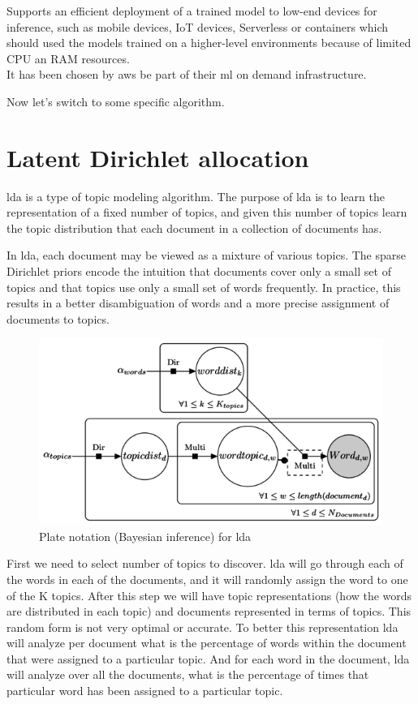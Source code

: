 \documentclass[thesis=M,english]{FITthesis}[2012/06/26]
\begin{document}
Supports an efficient deployment of a trained model to low-end devices for inference, such as mobile devices, IoT devices, Serverless or containers which should used the models trained on a higher-level environments because of limited CPU an RAM resources.\\

It has been chosen by \acrshort{aws} be part of their \acrshort{ml} on demand infrastructure.

Now let's switch to some specific algorithm.

\section{Latent Dirichlet allocation}\label{lda_algotithm}

\acrshort{lda}\cite{ml_lda} is a type of topic modeling algorithm. The purpose of \acrshort{lda} is to learn the representation of a fixed number of topics, and given this number of topics learn the topic distribution that each document in a collection of documents has.

In \acrshort{lda}, each document may be viewed as a mixture of various topics. The sparse Dirichlet priors encode the intuition that documents cover only a small set of topics and that topics use only a small set of words frequently. In practice, this results in a better disambiguation of words and a more precise assignment of documents to topics. 

\begin{figure}[h!]\centering
	\includegraphics[width=1\textwidth]{pictures/ml_lda_scheme}
	\caption{Plate notation (Bayesian inference) for \acrshort{lda} \cite{ml_lda_exmplanation}}\label{fig:ml_lda_scheme}
\end{figure}

First we need to select number of topics to discover. \acrshort{lda} will go through each of the words in each of the documents, and it will randomly assign the word to one of the K topics. After this step we will have topic representations (how the words are distributed in each topic) and documents represented in terms of topics. This random form is not very optimal or accurate. To better this representation \acrshort{lda} will analyze per document what is the percentage of words within the document that were assigned to a particular topic. And for each word in the document, \acrshort{lda} will analyze over all the documents, what is the percentage of times that particular word has been assigned to a particular topic.
\end{document}
